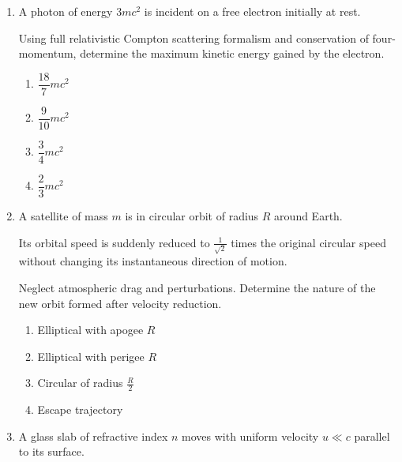 \documentclass[12pt]{article}
\begin{document}
\begin{enumerate}[leftmargin=*]
\begin{enumerate}
\item $\dfrac{1}{4\pi\epsilon_0}\dfrac{q^2 R a}{(a^2-R^2)^2}$
\item $\dfrac{1}{4\pi\epsilon_0}\dfrac{q^2 R}{(a^2-R^2)}$
\item $\dfrac{1}{4\pi\epsilon_0}\dfrac{q^2 R^2}{a^2(a^2-R^2)}$
\item $\dfrac{1}{4\pi\epsilon_0}\dfrac{q^2}{(a-R)^2}$
\end{enumerate}

\item A photon of energy $3mc^2$ is incident on a free electron initially at rest.  

Using full relativistic Compton scattering formalism and conservation of four-momentum, determine the maximum kinetic energy gained by the electron.

\begin{enumerate}
\item $\dfrac{18}{7}mc^2$
\item $\dfrac{9}{10}mc^2$
\item $\dfrac{3}{4}mc^2$
\item $\dfrac{2}{3}mc^2$
\end{enumerate}

\item A satellite of mass $m$ is in circular orbit of radius $R$ around Earth.  

Its orbital speed is suddenly reduced to $\frac{1}{\sqrt{2}}$ times the original circular speed without changing its instantaneous direction of motion.  

Neglect atmospheric drag and perturbations.  
Determine the nature of the new orbit formed after velocity reduction.

\begin{enumerate}
\item Elliptical with apogee $R$
\item Elliptical with perigee $R$
\item Circular of radius $\frac{R}{2}$
\item Escape trajectory
\end{enumerate}

\item A glass slab of refractive index $n$ moves with uniform velocity $u \ll c$ parallel to its surface.  


\end{enumerate}
\end{document}
